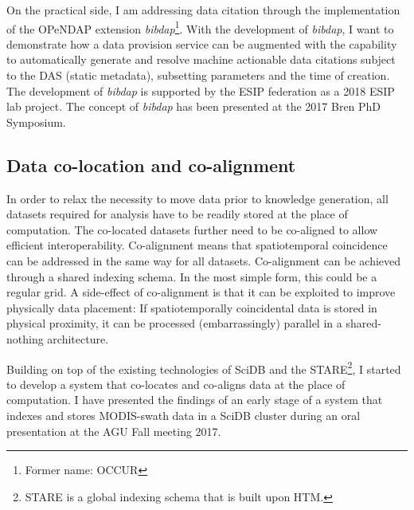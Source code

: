 \documentclass[a4paper,10pt]{article}
\begin{document}
On the practical side, I am addressing data citation through
the implementation of the OPeNDAP extension \textit{bibdap}\footnote{Former name: OCCUR}.
With the development of \textit{bibdap}, I want to demonstrate how a data provision service can be augmented with the capability to automatically generate and resolve machine actionable data citations subject to the \gls{DAS} (static metadata), subsetting parameters and the time of creation. The development of \textit{bibdap} is supported by the ESIP federation as a 2018 \gls{ESIP} lab project. The concept of \textit{bibdap} has been presented at the 2017 Bren PhD Symposium.
  
\newpage

\subsection{Data co-location and co-alignment}
In order to relax the necessity to move data prior to knowledge generation, 
all datasets required for analysis have to be readily stored at the place of computation.
The co-located datasets further need to be co-aligned
to allow efficient interoperability. 
Co-alignment means that spatiotemporal coincidence can be addressed
in the same way for all datasets. Co-alignment can be achieved through a shared
indexing schema. 
In the most simple form, this could be a regular grid. 
A side-effect of co-alignment is that it can be exploited to improve physically data placement: If spatiotemporally coincidental data is stored in physical proximity, 
it can be processed (embarrassingly) parallel in a shared-nothing architecture.

Building on top of the existing technologies of SciDB and the \gls{STARE}\footnote{STARE is a global indexing schema that is built upon \gls{HTM}.}, 
I started to develop a system that co-locates and co-aligns data at the place of computation. I have presented the findings of an early stage of a system that indexes and stores MODIS-swath data in a SciDB cluster during an oral presentation at the AGU Fall meeting 2017.
\end{document}
